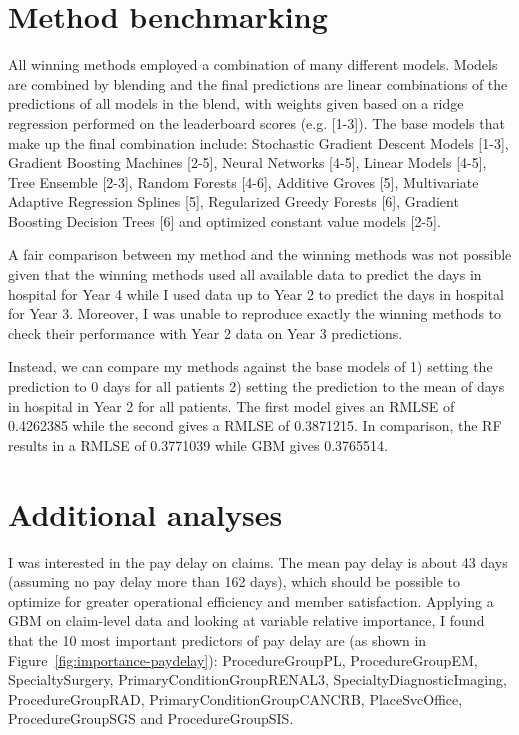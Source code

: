 \documentclass[8pt]{article}
\begin{document}
\section{Method benchmarking}
\label{sec:comparison}
All winning methods employed a combination of many different models.
Models are combined by blending and the final predictions are linear combinations of the predictions of all models in the blend, with weights given based on a ridge regression performed on the leaderboard scores (e.g. [1-3]). The base models that make up the final combination include: Stochastic Gradient Descent Models [1-3], Gradient Boosting Machines [2-5], Neural Networks [4-5], Linear Models [4-5], Tree Ensemble [2-3], Random Forests [4-6], Additive Groves [5], Multivariate Adaptive Regression Splines [5], Regularized Greedy Forests [6], Gradient Boosting Decision Trees [6] and optimized constant value models [2-5].

A fair comparison between my method and the winning methods was not possible given that the winning methods used all available data to predict the days in hospital for Year 4 while I used data up to Year 2 to predict the days in hospital for Year 3. Moreover, I was unable to reproduce exactly the winning methods to check their performance with Year 2 data on Year 3 predictions.

Instead, we can compare my methods against the base models of 1) setting the prediction to 0 days for all patients 2) setting the prediction to the mean of days in hospital in Year 2 for all patients. The first model gives an RMLSE of 0.4262385 while the second gives a RMLSE of 0.3871215. In comparison, the RF results in a RMLSE of 0.3771039 while GBM gives 0.3765514.
\section{Additional analyses}
\label{sec:addition}
I was interested in the pay delay on claims. The mean pay delay is about 43 days (assuming no pay delay more than 162 days), which should be possible to optimize for greater operational efficiency and member satisfaction. Applying a GBM on claim-level data and looking at variable relative importance, I found that the 10 most important predictors of pay delay are (as shown in Figure~\ref{fig:importance-paydelay}): ProcedureGroupPL, ProcedureGroupEM, SpecialtySurgery, PrimaryConditionGroupRENAL3, SpecialtyDiagnosticImaging, ProcedureGroupRAD, PrimaryConditionGroupCANCRB, PlaceSvcOffice, ProcedureGroupSGS and ProcedureGroupSIS.
\end{document}

